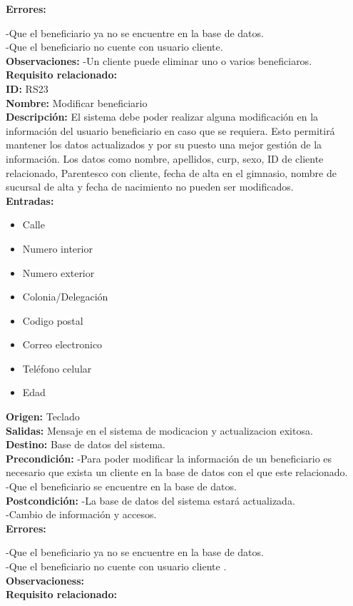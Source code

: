 \textbf{Errores: }

-Que el beneficiario ya  no se encuentre en la base de datos.\\
-Que el beneficiario no cuente con usuario cliente.\\

\textbf{Observaciones: }
-Un cliente puede eliminar  uno o varios beneficiaros.\\
\textbf{Requisito relacionado:} \\


\textbf{ID:} RS23\\
\textbf{Nombre:} Modificar beneficiario\\
\textbf{Descripción:} El sistema debe poder realizar alguna modificación en la información del usuario beneficiario en caso que se requiera. Esto permitirá mantener los datos actualizados y por su puesto una mejor gestión de la información. Los datos como nombre, apellidos, curp, sexo, ID de cliente relacionado, Parentesco con cliente, fecha de alta en el gimnasio, nombre de sucursal de alta y fecha de nacimiento no pueden ser modificados.\\

\textbf{Entradas: }
        \begin{itemize}
         \item Calle 
         \item Numero interior 
         \item Numero exterior 
         \item Colonia/Delegación
         \item Codigo postal
         \item Correo electronico
         \item Teléfono celular
         \item Edad 

\end{itemize}
\textbf{Origen:} Teclado\\
\textbf{Salidas:} Mensaje en el sistema de modicacion y actualizacion exitosa.\\
\textbf{Destino:} Base de datos del sistema.\\
\textbf{Precondición: }
-Para poder modificar la información de un beneficiario es necesario que exista un cliente en la base de datos con el que este relacionado.\\
-Que el beneficiario  se encuentre en la base de datos.\\


\textbf{Postcondición: }
-La base de datos del sistema estará actualizada.\\
-Cambio de información y accesos.\\


\textbf{Errores: }

-Que el beneficiario ya  no se encuentre en la base de datos.\\
-Que el beneficiario no cuente con usuario cliente .\\


\textbf{Observacioness: }
\\
\textbf{Requisito relacionado:} \\
